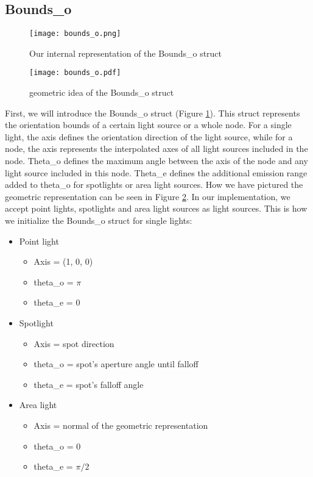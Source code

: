 \subsection{Bounds\_o}

\begin{figure}
	\begin{center}
		\texttt{[image: bounds\_o.png]}
		\caption{Our internal representation of the Bounds\_o struct}
		\label{fig:boundso}
	\end{center}
\end{figure}

\begin{figure}
	\begin{center}
		\texttt{[image: bounds\_o.pdf]}
		\caption{geometric idea of the Bounds\_o struct}
		\label{fig:boundsogeo}
	\end{center}
\end{figure}

First, we will introduce the Bounds\_o struct (Figure \ref{fig:boundso}). This struct represents the orientation bounds of a certain light source or a whole node. For a single light, the axis defines the orientation direction of the light source, while for a node, the axis represents the interpolated axes of all light sources included in the node. Theta\_o defines the maximum angle between the axis of the node and any light source included in this node. Theta\_e defines the additional emission range added to theta\_o for spotlights or area light sources. How we have pictured the geometric representation can be seen in Figure \ref{fig:boundsogeo}. In our implementation, we accept point lights, spotlights and area light sources as light sources. This is how we initialize the Bounds\_o struct for single lights:

\begin{itemize}
	  \setlength\itemsep{0em}
	\item Point light
	\begin{itemize}
		  \setlength\itemsep{0em}
		\item Axis = (1, 0, 0)
		\item theta\_o = $\pi$
		\item theta\_e = 0
	\end{itemize}
	\item Spotlight
	\begin{itemize}
		  \setlength\itemsep{0em}
		\item Axis = spot direction
		\item theta\_o = spot's aperture angle until falloff
		\item theta\_e = spot's falloff angle
	\end{itemize}
	\item Area light
	\begin{itemize}
		  \setlength\itemsep{0em}
		\item Axis = normal of the geometric representation
		\item theta\_o = 0
		\item theta\_e = $\pi/2$
	\end{itemize}
\end{itemize}


